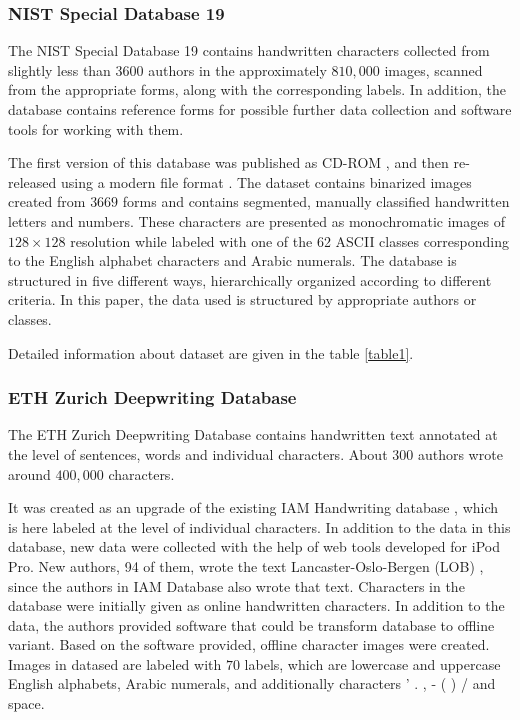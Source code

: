 \documentclass{article}
\begin{document}
\subsubsection{NIST Special Database 19}

The NIST Special Database 19 \citep{nist} contains handwritten characters collected from slightly less than $3600$ authors in the approximately $810,000$ images,
scanned from the appropriate forms, along with the corresponding labels.
In addition, the database contains reference forms for possible further data collection and software tools for working with them.

The first version of this database was published as CD-ROM \citep{nistv0}, and then re-released using a modern file format \citep{nist}.
The dataset contains binarized images created from $3669$ forms and contains segmented, manually classified handwritten letters and numbers.
These characters are presented as monochromatic images of $128 \times 128$ resolution while labeled with one of the 62 ASCII classes corresponding to the English alphabet characters and Arabic numerals.
The database is structured in five different ways, hierarchically organized according to different criteria.
In this paper, the data used is structured by appropriate authors or classes.

Detailed information about dataset are given in the table \ref{table1}.

\subsubsection{ETH Zurich Deepwriting Database}

The ETH Zurich Deepwriting Database\citep{deepwriting} contains handwritten text annotated at the level of sentences, words and individual characters.
About $300$ authors wrote around $400,000$ characters.

It was created as an upgrade of the existing IAM Handwriting database \citep{iam}, which is here labeled at the level of individual characters.
In addition to the data in this database, new data were collected with the help of web tools developed for iPod Pro.
New authors, 94 of them, wrote the text Lancaster-Oslo-Bergen (LOB) \citep{lob}, since the authors in IAM Database also wrote that text.
Characters in the database were initially given as online handwritten characters.
In addition to the data, the authors provided software that could be transform database to offline variant.
Based on the software provided, offline character images were created.
Images in datased are labeled with $70$ labels, which are lowercase and uppercase English alphabets, Arabic numerals, and additionally characters
' . , - ( ) / and space.
\end{document}
